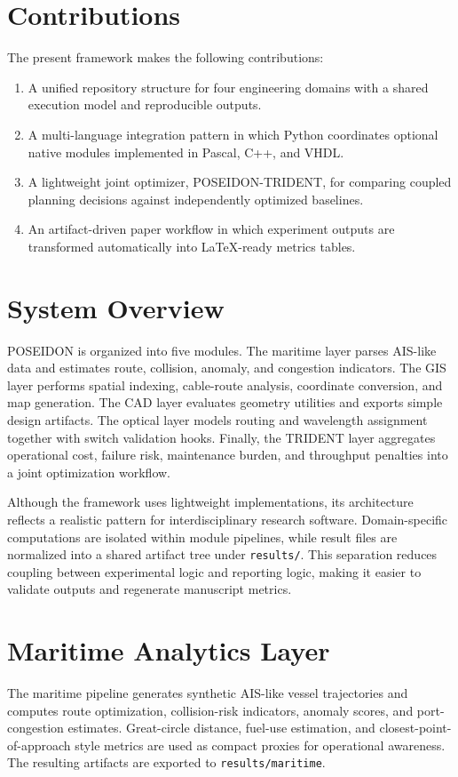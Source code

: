 \documentclass[conference]{IEEEtran}
\begin{document}
\section{Contributions}
The present framework makes the following contributions:
\begin{enumerate}
\item A unified repository structure for four engineering domains with a shared execution model and reproducible outputs.
\item A multi-language integration pattern in which Python coordinates optional native modules implemented in Pascal, C++, and VHDL.
\item A lightweight joint optimizer, POSEIDON-TRIDENT, for comparing coupled planning decisions against independently optimized baselines.
\item An artifact-driven paper workflow in which experiment outputs are transformed automatically into LaTeX-ready metrics tables.
\end{enumerate}

\section{System Overview}
POSEIDON is organized into five modules. The maritime layer parses AIS-like data and estimates route, collision, anomaly, and congestion indicators. The GIS layer performs spatial indexing, cable-route analysis, coordinate conversion, and map generation. The CAD layer evaluates geometry utilities and exports simple design artifacts. The optical layer models routing and wavelength assignment together with switch validation hooks. Finally, the TRIDENT layer aggregates operational cost, failure risk, maintenance burden, and throughput penalties into a joint optimization workflow.

Although the framework uses lightweight implementations, its architecture reflects a realistic pattern for interdisciplinary research software. Domain-specific computations are isolated within module pipelines, while result files are normalized into a shared artifact tree under \texttt{results/}. This separation reduces coupling between experimental logic and reporting logic, making it easier to validate outputs and regenerate manuscript metrics.

\section{Maritime Analytics Layer}
The maritime pipeline generates synthetic AIS-like vessel trajectories and computes route optimization, collision-risk indicators, anomaly scores, and port-congestion estimates. Great-circle distance, fuel-use estimation, and closest-point-of-approach style metrics are used as compact proxies for operational awareness. The resulting artifacts are exported to \texttt{results/maritime}.
\end{document}
